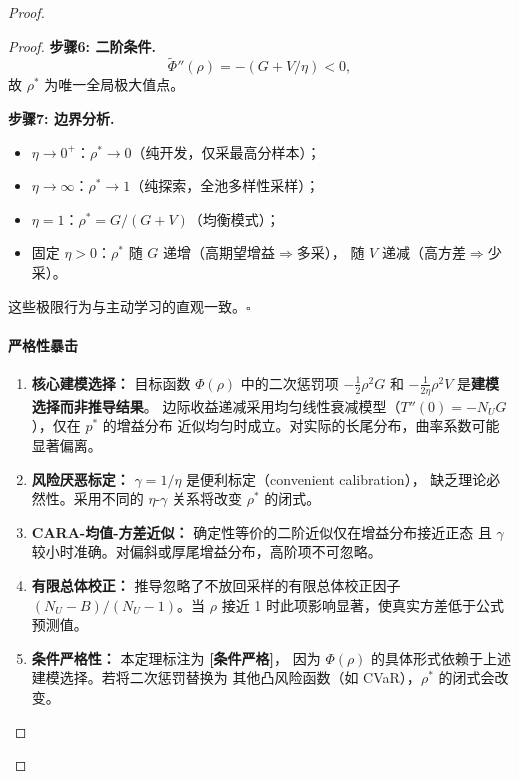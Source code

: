 \documentclass[12pt,a4paper]{article}
\newcommand{\conditionallyrigorous}{\textbf{[条件严格]}}
\newenvironment{critique}{\paragraph{严格性暴击}\quad}{\par}
\begin{document}
\begin{proof}
\begin{proof}
\textbf{步骤6: 二阶条件.}
\[
\tilde\Phi''(\rho) = -(G + V/\eta) < 0,
\]
故 $\rho^*$ 为唯一全局极大值点。

\textbf{步骤7: 边界分析.}
\begin{itemize}
    \item $\eta\to0^+$：$\rho^*\to0$（纯开发，仅采最高分样本）；
    \item $\eta\to\infty$：$\rho^*\to1$（纯探索，全池多样性采样）；
    \item $\eta=1$：$\rho^* = G/(G+V)$（均衡模式）；
    \item 固定 $\eta>0$：$\rho^*$ 随 $G$ 递增（高期望增益$\Rightarrow$多采），
          随 $V$ 递减（高方差$\Rightarrow$少采）。
\end{itemize}
这些极限行为与主动学习的直观一致。\hfill$\square$

\begin{critique}
\begin{enumerate}
    \item \textbf{核心建模选择：} 目标函数 $\Phi(\rho)$ 中的二次惩罚项
    $-\tfrac12\rho^2 G$ 和 $-\tfrac1{2\eta}\rho^2 V$ 是\textbf{建模选择而非推导结果}。
    边际收益递减采用均匀线性衰减模型（$T''(0)=-N_U G$），仅在 $p^*$ 的增益分布
    近似均匀时成立。对实际的长尾分布，曲率系数可能显著偏离。
    \item \textbf{风险厌恶标定：} $\gamma=1/\eta$ 是便利标定（convenient calibration），
    缺乏理论必然性。采用不同的 $\eta$-$\gamma$ 关系将改变 $\rho^*$ 的闭式。
    \item \textbf{CARA-均值-方差近似：} 确定性等价的二阶近似仅在增益分布接近正态
    且 $\gamma$ 较小时准确。对偏斜或厚尾增益分布，高阶项不可忽略。
    \item \textbf{有限总体校正：} 推导忽略了不放回采样的有限总体校正因子
    $(N_U-B)/(N_U-1)$。当 $\rho$ 接近 1 时此项影响显著，使真实方差低于公式预测值。
    \item \textbf{条件严格性：} 本定理标注为 \conditionallyrigorous，
    因为 $\Phi(\rho)$ 的具体形式依赖于上述建模选择。若将二次惩罚替换为
    其他凸风险函数（如 CVaR），$\rho^*$ 的闭式会改变。
\end{enumerate}
\end{critique}


\end{proof}
\end{proof}
\end{document}
